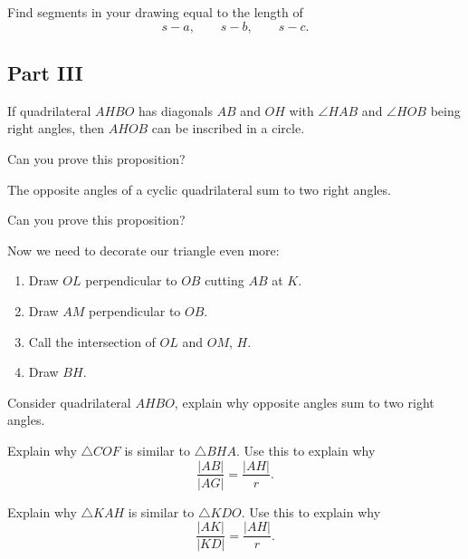 \documentclass[nooutcomes]{ximera}
\begin{document}
\begin{question}
Find segments in your drawing equal to the length of 
\[
s-a,\qquad s-b,\qquad s-c.
\] 
\end{question}


\subsection*{Part III}

\begin{proposition}
If quadrilateral $AHBO$ has diagonals $AB$ and $OH$ with $\angle HAB$ and $\angle HOB$ being right angles, then $AHOB$ can be inscribed in a circle.
\end{proposition}

\begin{question}
Can you prove this proposition?
\end{question}

\begin{proposition}\label{P:cyclic}
The opposite angles of a cyclic quadrilateral sum to two right angles. 
\end{proposition}

\begin{question}
Can you prove this proposition?
\end{question}


\begin{question}
Now we need to decorate our triangle even more:
\begin{enumerate}
\item Draw $OL$ perpendicular to $OB$ cutting $AB$ at $K$. 
\item Draw $AM$ perpendicular to $OB$.
\item Call the intersection of $OL$ and $OM$, $H$. 
\item Draw $BH$. 
\end{enumerate}
Consider quadrilateral $AHBO$, explain why opposite angles sum to two right angles. 
\end{question}


\begin{question}
Explain why $\triangle COF$ is similar to $\triangle BHA$. Use this to explain why
\[
\frac{|AB|}{|AG|} = \frac{|AH|}{r}.
\]
\end{question}

\begin{question}
Explain why $\triangle KAH$ is similar to $\triangle KDO$. Use this to explain why
\[
\frac{|AK|}{|KD|} = \frac{|AH|}{r}.
\]
\end{question}
\end{document}
